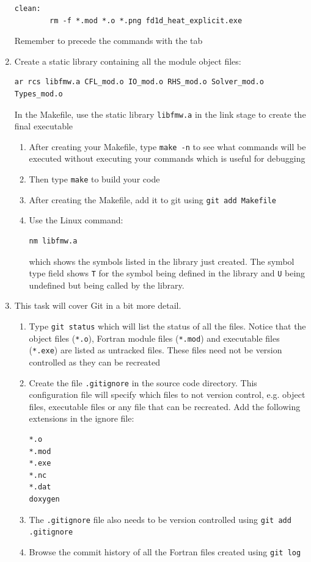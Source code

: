 \documentclass[12pt]{article}
\begin{document}
\begin{enumerate}
\begin{verbatim}
clean:
        rm -f *.mod *.o *.png fd1d_heat_explicit.exe
\end{verbatim}
Remember to precede the commands with the tab
\item Create a static library containing all the module object files:
\begin{verbatim}
ar rcs libfmw.a CFL_mod.o IO_mod.o RHS_mod.o Solver_mod.o Types_mod.o
\end{verbatim}
In the Makefile, use the static library \texttt{libfmw.a} in the link stage to create the final executable
\begin{enumerate}
\item After creating your Makefile, type \texttt{make -n} to see what commands will be executed without executing
your commands which is useful for debugging
\item Then type \texttt{make} to build your code 
\item After creating the Makefile, add it to git using \texttt{git add Makefile}
\item Use the Linux command: 
\begin{verbatim}
nm libfmw.a
\end{verbatim}
which shows the symbols listed in the library just created. The symbol type field shows \texttt{T} for the symbol being 
defined in the library and \texttt{U} being undefined but being called by the library. 
\end{enumerate}
\item This task will cover Git in a bit more detail.
\begin{enumerate}
\item Type \texttt{git status} which will list the status of all the files. Notice that the object 
files (\texttt{*.o}), Fortran module files (\texttt{*.mod}) and executable files (\texttt{*.exe}) are listed as 
untracked files. These files need not be version controlled as they can be recreated
\item Create the file \texttt{.gitignore} in the source code directory. This configuration file will 
specify which files to not version control, e.g. object files, executable files or any file that can
be recreated. Add the following extensions in the ignore file:
\begin{verbatim}
*.o
*.mod
*.exe
*.nc
*.dat
doxygen
\end{verbatim}
\item The \texttt{.gitignore} file also needs to be version controlled using \texttt{git add .gitignore}
\item Browse the commit history of all the Fortran files created using \texttt{git log}

\end{enumerate}
\end{enumerate}
\end{document}
